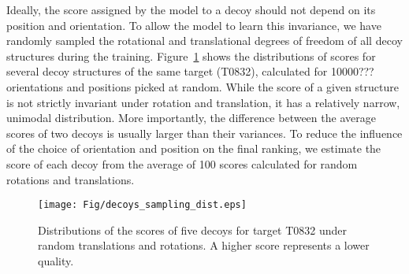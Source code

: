 Ideally, the score assigned by the model to a decoy should not depend
on its position and orientation.  To allow the model to learn this
invariance, we have randomly sampled the rotational and translational
degrees of freedom of all decoy structures during the training.
%
Figure~\ref{Fig:DecoysScoreDistribution} shows the distributions of
scores for several decoy structures of the same target (T0832),
calculated for 10000??? orientations and positions picked at random.
While the score of a given structure is not strictly invariant under
rotation and translation, it has a relatively narrow, unimodal
distribution.
More importantly, the difference between the average scores of two
decoys is usually larger than their variances. To reduce the influence
of the choice of orientation and position on the final ranking, we
estimate the score of each decoy from the average of 100 scores
calculated for random rotations and translations.






\begin{figure}[H]
    \centering
    \texttt{[image: Fig/decoys\_sampling\_dist.eps]}
%
    \caption{Distributions of the scores of five decoys for target
    T0832 under random translations and rotations. A higher score
    represents a lower quality.}
%
    \label{Fig:DecoysScoreDistribution}
\end{figure}


